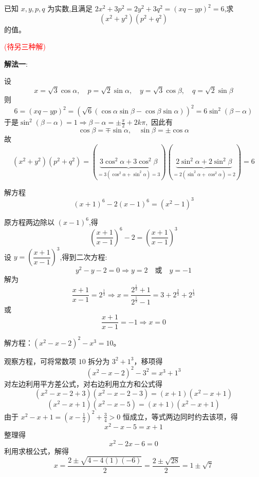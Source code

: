 \begin{questions}
\question 已知 $x, y, p, q$ 为实数,且满足 $2x^{2}+3p^{2}=2y^{2}+3q^{2}=(xq-yp)^{2}=6$,求 $$(x^{2}+y^{2})(p^{2}+q^{2})$$ 的值。

\begin{solution}
\textcolor{red}{(待另三种解)}
\end{solution}

    \begin{solution}
        \textbf{解法一}:
        
        设
        \[
        x = \sqrt{3} \cos\alpha, \quad p = \sqrt{2} \sin\alpha, \quad y = \sqrt{3} \cos\beta, \quad q = \sqrt{2} \sin\beta
        \]
        则
        \[
        6=(xq - yp)^2 = (\sqrt{6}(\cos\alpha \sin\beta - \cos\beta \sin\alpha))^2= 6\sin^2(\beta - \alpha)
        \]
        于是$\sin^2(\beta - \alpha) = 1 \Rightarrow \beta - \alpha = \pm \frac{\pi}{2} + 2k\pi,$
        因此有
        \[
        \cos\beta = \mp \sin\alpha, \quad \sin\beta = \pm \cos\alpha
        \]
        故
        \[
        (x^2 + y^2)(p^2 + q^2) = (\underbrace{3\cos^2\alpha + 3\cos^2\beta}_{=3(\cos^2\alpha + \sin^2\alpha) = 3})(\underbrace{2\sin^2\alpha + 2\sin^2\beta}_{=2(\sin^2\alpha + \cos^2\alpha) = 2})
        = 6
        \]
    \end{solution}

    \question 解方程
    \[
    (x+1)^6-2(x-1)^6 = (x^2-1)^3
    \]
    \begin{solution}
        原方程两边除以 $(x-1)^6$,得
        \[
        \left(\frac{x+1}{x-1}\right)^6 - 2 = \left(\frac{x+1}{x-1}\right)^3
        \]
        设 $y = \left(\dfrac{x+1}{x-1}\right)^3$,得到二次方程:
        \[
        y^2 - y - 2 = 0 \Rightarrow y = 2 \quad \text{或} \quad y=-1
        \]
        解为
        \[
        \frac{x+1}{x-1} = 2^{\frac{1}{3}} \Rightarrow x = \frac{2^{\frac{1}{3}}+1}{2^{\frac{1}{3}}-1} = 3+2^{\frac{2}{3}}+2^{\frac{1}{3}}
        \]
        或
        \[
        \frac{x+1}{x-1} = -1 \Rightarrow x = 0
        \]
    \end{solution}

\question 解方程：$(x^2 - x - 2)^2 - x^3 = 10$。

\begin{solution}
观察方程，可将常数项 $10$ 拆分为 $3^2 + 1^3$，移项得
\[
(x^2 - x - 2)^2 - 3^2 = x^3 + 1^3
\]
对左边利用平方差公式，对右边利用立方和公式得
\[
(x^2 - x - 2 + 3)(x^2 - x - 2 - 3) = (x+1)(x^2 - x + 1)
\]
\[
(x^2 - x + 1)(x^2 - x - 5) = (x+1)(x^2 - x + 1)
\]
由于 $x^2 - x + 1 = \left(x - \frac{1}{2}\right)^2 + \frac{3}{4} > 0$ 恒成立，等式两边同时约去该项，得
\[
x^2 - x - 5 = x + 1
\]
整理得
\[
x^2 - 2x - 6 = 0
\]
利用求根公式，解得
\[
x = \frac{2 \pm \sqrt{4 - 4(1)(-6)}}{2} = \frac{2 \pm \sqrt{28}}{2} = 1 \pm \sqrt{7}
\]
\end{solution}


\end{questions}
